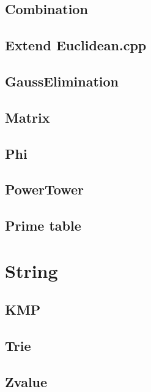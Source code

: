 \subsection{Combination}

\subsection{Extend Euclidean.cpp}

\subsection{GaussElimination}

\subsection{Matrix}

\subsection{Phi}

\subsection{PowerTower}

\subsection{Prime table}


\section{String}

\subsection{KMP}

\subsection{Trie}

\subsection{Zvalue}
